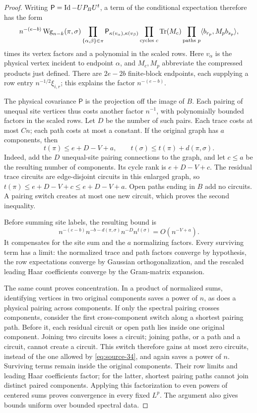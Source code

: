 \begin{proof}
Writing $\mathsf P=\operatorname{Id}-UP_BU^t$, a term of the conditional expectation
therefore has the form
\[
 n^{-(e-b)}\,\mathrm{Wg}_{n-k}(\pi,\sigma)
 \prod_{\{\alpha,\beta\}\in\pi}
       \mathsf P_{\kappa(v_\alpha),\kappa(v_\beta)}
 \prod_{\text{cycles }c}\operatorname{Tr}(M_c)
 \prod_{\text{paths }p}\langle b_{r_p},M_p b_{s_p}\rangle,
\]
times its vertex factors and a polynomial in the scaled rows. Here
$v_\alpha$ is the physical vertex incident to endpoint $\alpha$, and
$M_c,M_p$ abbreviate the compressed products just defined.
There are $2e-2b$ finite-block endpoints, each supplying a row entry
$n^{-1/2}\xi_{i,r}$; this explains the factor $n^{-(e-b)}$.

The physical covariance $\mathsf P$ is the projection off the image of $B$.
Each pairing of unequal site vertices thus costs another factor $n^{-1}$,
with polynomially bounded factors in the scaled rows. Let $D$ be the
number of such pairs. Each trace costs at most $Cn$; each path costs at
most a constant. If the original graph has $a$
components, then
\begin{equation}
 t(\pi)\le e+D-V+a,
 \qquad
 t(\sigma)\le t(\pi)+d(\pi,\sigma).
 \label{eq:source-34}
\end{equation}
Indeed, add the $D$ unequal-site pairing connections to the graph, and
let $c\le a$ be the resulting number of components. Its cycle rank is
$e+D-V+c$. The residual trace circuits are edge-disjoint circuits in this
enlarged graph, so $t(\pi)\le e+D-V+c\le e+D-V+a$.
Open paths ending in $B$ add no circuits. A pairing switch creates at
most one new circuit, which proves the second inequality.

Before summing site labels, the resulting bound is
\[
 n^{-(e-b)}n^{-b-d(\pi,\sigma)}n^{-D}n^{t(\sigma)}
       =O(n^{-V+a}).
\]
It compensates for the site sum and the $a$ normalizing factors.
Every surviving term has a limit: the normalized trace and path factors
converge by hypothesis, the row expectations converge by Gaussian
orthogonalization, and the rescaled leading Haar coefficients converge
by the Gram-matrix expansion.

The same count proves concentration. In a product of normalized sums,
identifying vertices in two original components saves a power of $n$,
as does a physical pairing across components. If only the spectral
pairing crosses components, consider the first cross-component switch
along a shortest pairing path. Before it, each residual circuit or open
path lies inside one original component. Joining two circuits loses a
circuit; joining paths, or a path and a circuit, cannot create a circuit.
This switch therefore gains at most zero circuits, instead of the one
allowed by \eqref{eq:source-34}, and again saves a power of $n$.
Surviving terms remain inside the original components. Their row limits
and leading Haar coefficients factor; for the latter, shortest pairing
paths cannot join distinct paired components. Applying this factorization
to even powers of centered sums proves convergence in every fixed $L^p$.
The argument also gives bounds uniform over bounded spectral data.


\end{proof}
